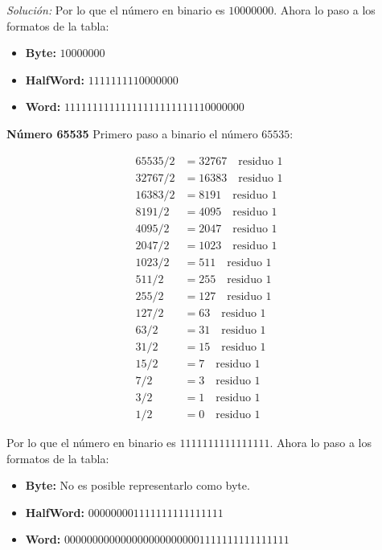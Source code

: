 \documentclass{article}
\newenvironment{solution}
    {\textit{Solución:}}
    {}
\begin{document}
\begin{solution}
Por lo que el número en binario es $10000000$. Ahora lo paso a los formatos de la tabla:

\begin{itemize}
    \item \textbf{Byte:} $10000000$
    \item \textbf{HalfWord:} $1111111110000000$
    \item \textbf{Word:} $11111111111111111111111110000000$
\end{itemize}

\textbf{Número 65535}
Primero paso a binario el número $65535$:

\begin{align*}
    65535/2 &= 32767 \quad \text{residuo } 1\\
    32767/2 &= 16383 \quad \text{residuo } 1\\
    16383/2 &= 8191 \quad \text{residuo } 1\\
    8191/2 &= 4095 \quad \text{residuo } 1\\
    4095/2 &= 2047 \quad \text{residuo } 1\\
    2047/2 &= 1023 \quad \text{residuo } 1\\
    1023/2 &= 511 \quad \text{residuo } 1\\
    511/2 &= 255 \quad \text{residuo } 1\\
    255/2 &= 127 \quad \text{residuo } 1\\
    127/2 &= 63 \quad \text{residuo } 1\\
    63/2 &= 31 \quad \text{residuo } 1\\
    31/2 &= 15 \quad \text{residuo } 1\\
    15/2 &= 7 \quad \text{residuo } 1\\
    7/2 &= 3 \quad \text{residuo } 1\\
    3/2 &= 1 \quad \text{residuo } 1\\
    1/2 &= 0 \quad \text{residuo } 1
\end{align*}

Por lo que el número en binario es $1111111111111111$. Ahora lo paso a los formatos de la tabla:

\begin{itemize}
    \item \textbf{Byte:} No es posible representarlo como byte.
    \item \textbf{HalfWord:} $000000001111111111111111$
    \item \textbf{Word:} $0000000000000000000000001111111111111111$
\end{itemize}


\end{solution}
\end{document}
